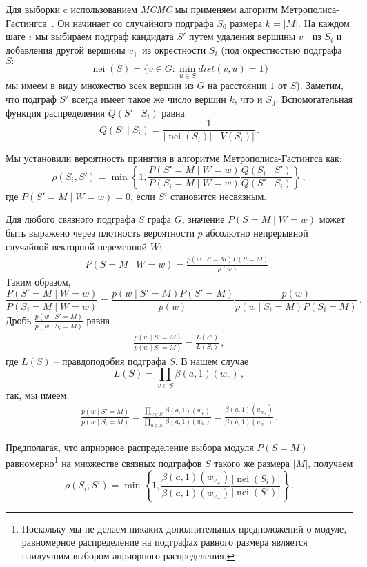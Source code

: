 Для выборки c использованием \emph{MCMC} мы применяем алгоритм
Метрополиса-Гастингса~\cite{Hastings1970}.  Он начинает со случайного подграфа
$S_0$ размера $k=|M|$. На каждом шаге $i$ мы выбираем подграф кандидата $S'$
путем удаления вершины $v_-$ из $S_i$ и добавления другой вершины $v_+$ из
окрестности $S_i$ (под окрестностью подграфа $S:$
\[\operatorname{nei}(S) = \{v \in G: \min_{u \in S} dist(v,u) =1\}\]
мы имеем в виду множество всех вершин из $G$ на расстоянии $1$ от $S$).
Заметим, что подграф $S'$ всегда имеет такое же число вершин $k$, что и $S_0$.
Вспомогательная функция распределения $Q(S' \mid S_i)$ равна
\[Q(S' \mid S_i) = \frac{1}{|\operatorname{nei}(S_{i})| \cdot |V(S_i)|} \, .\]

Мы установили вероятность принятия в алгоритме Метрополиса-Гастингса как:
\[\rho(S_i,S') = \min \left\{1,\frac{P(S'=M \mid W = w)}{P(S_i=M \mid
W = w)}\frac{Q(S_i \mid S')}{Q(S' \mid S_i)} \right\} \, ,\]
где $P(S'=M \mid W = w) = 0$, если $S'$ становится несвязным. 

Для любого связного подграфа $S$ графа $G$, значение $P(S=M \mid W=w)$ может
быть выражено через плотность вероятности $p$ абсолютно непрерывной случайной
векторной переменной $W$:
\begin{align}
    P(S=M \mid W = w) = \frac{p(w \mid S=M)P(S=M)}{p(w)} \, .
    \label{eq:graphprobs}
\end{align}
Таким образом,
\[\frac{P(S'=M \mid W = w)}{P(S_i=M \mid W = w)} = \frac{p(w \mid
S'=M)P(S'=M)}{p(w)}\frac{p(w)}{p(w \mid S_i=M)P(S_i=M)} \, .\]
Дробь $\frac{p(w \mid S'=M)}{p(w \mid S_i=M)}$ равна
\begin{align}
    \frac{p(w \mid S'=M)}{p(w \mid S_i=M)} = \frac{L(S')}{L(S_i)} \, ,
    \label{eq:likelihood}
\end{align}
где $L(S)$ -- правдоподобия подграфа $S$. В нашем случае
\[L(S) = \prod_{v\in S}\beta(a,1)(w_v) \, ,\]
так, мы имеем:
\begin{align}
    \frac{p(w \mid S'=M)}{p(w \mid S_i=M)} = \frac{\prod_{v\in S'}\beta(a,1)(w_v)}{\prod_{u\in S_i}\beta(a,1)(w_u)} = \frac{\beta(a,1)(w_{v_+})}{\beta(a,1)(w_{v_-})} \, .
    \label{eq:accept_probs}
\end{align}

Предполагая, что априорное распределение выбора модуля $P(S=M)$
равномерно\footnote{Поскольку мы не делаем никаких дополнительных предположений
о модуле, равномерное распределение на подграфах равного размера является
наилучшим выбором априорного распределения.} на множестве связных подграфов $S$
такого же размера $|M|$, получаем
\[ \rho(S_i,S') = \min \left\{1,
\frac{\beta(a,1)(w_{v_+})}{\beta(a,1)(w_{v_-})}
\frac{|\operatorname{nei}(S_{i})|}{|\operatorname{nei}(S')|} \right\} \, .\]

